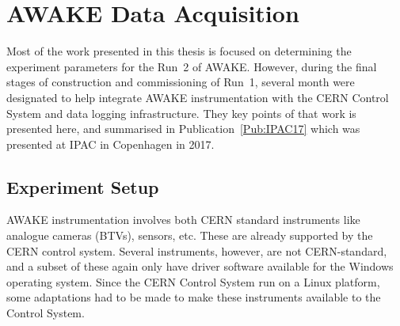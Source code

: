 %
%

\chapter{AWAKE Data Acquisition}
\label{Ch:DAQ}

Most of the work presented in this thesis is focused on determining the experiment parameters for the Run~2 of AWAKE.
However, during the final stages of construction and commissioning of Run~1, several month were designated to help integrate AWAKE instrumentation with the CERN Control System and data logging infrastructure.
They key points of that work is presented here, and summarised in Publication~\ref{Pub:IPAC17} which was presented at IPAC in Copenhagen in 2017.

\section{Experiment Setup}
\label{DAQ:Experiment}

AWAKE instrumentation involves both CERN standard instruments like analogue cameras (BTVs), sensors, etc.
These are already supported by the CERN control system.
Several instruments, however, are not CERN-standard, and a subset of these again only have driver software available for the Windows operating system.
Since the CERN Control System run on a Linux platform, some adaptations had to be made to make these instruments available to the Control System.

